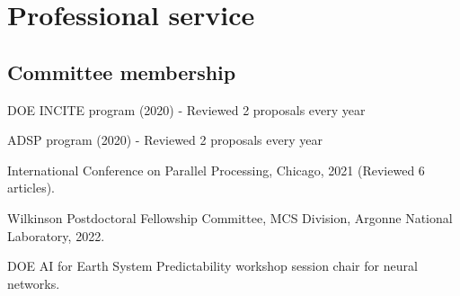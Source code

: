\documentclass[letterpaper]{article}
\renewenvironment{itemize}{
  \begin{list}{}{
    \setlength{\leftmargin}{1.5em}
  }
}{
  \end{list}
}
\begin{document}





    
    
    

\section*{Professional service}

\subsection*{Committee membership}

\begin{itemize}
\item DOE INCITE program (2020) - Reviewed 2 proposals every year
\item ADSP program (2020) - Reviewed 2 proposals every year
\item International Conference on Parallel Processing, Chicago, 2021 (Reviewed 6 articles).
\item Wilkinson Postdoctoral Fellowship Committee, MCS Division, Argonne National Laboratory, 2022.
\item DOE AI for Earth System Predictability workshop session chair for neural networks.
\end{itemize}
\end{document}
